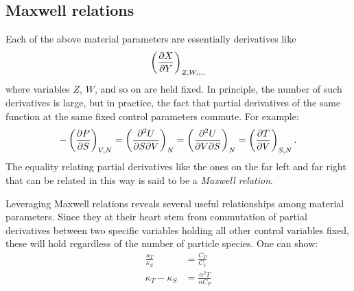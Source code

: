 \subsection{Maxwell relations}

Each of the above material parameters are essentially derivatives like
\begin{equation}
\left(\pdv{X}{Y}\right)_{Z,W,...}
\end{equation}
where variables $Z$, $W$, and so on are held fixed. In principle, the
number of such derivatives is large, but in practice, the fact
that partial derivatives of the same function at the same fixed
control parameters commute. For example:
\begin{equation}
-\left(\pdv{P}{S}\right)_{V,N}
=\left(\frac{\partial^2 U}{\partial S\partial V}\right)_{N}
=\left(\frac{\partial^2 U}{\partial V\partial S}\right)_{N}
=\left(\pdv{T}{V}\right)_{S,N}.
\end{equation}
The equality relating partial derivatives like the ones on the far left
and far right that can be related in this way is said to
be a {\it Maxwell relation}.

Leveraging Maxwell relations reveals several useful relationships
among material parameters. Since they at their heart stem from
commutation of partial derivatives between two specific variables holding
all other control variables fixed, these will hold regardless of
the number of particle species. One can show:
\begin{equation}\begin{aligned}
 \frac{\kappa_T}{\kappa_S}&=\frac{C_P}{C_V}\\
 \kappa_T-\kappa_S&=\frac{\alpha^2 T}{n C_P}
\end{aligned}\end{equation}




